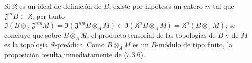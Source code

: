 Si $\mathfrak K$ es un ideal de definición de $B$, existe por hipótesis
un entero $m$ tal que $\mathfrak J^mB\subset\mathfrak K$, por tanto
$\Im(B\otimes_A\mathfrak J^{nm}M)=
\Im(\mathfrak J^{nm}B\otimes_A M)\subset
\Im(\mathfrak K^nB\otimes_A M)=\mathfrak K^n(B\otimes_A M)$; se
concluye que sobre $B\otimes_A M$, el producto tensorial de las topologías de $B$
y de $M$ es la topología $\mathfrak K$-preádica. Como $B\otimes_A M$
es un $B$-módulo de tipo finito, la proposición resulta inmediatamente de (7.3.6).

